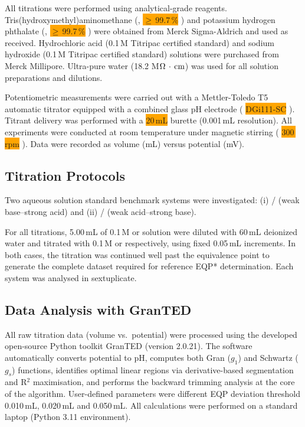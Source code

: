 \documentclass[twoside,twocolumn,9pt]{article}
\begin{document}
All titrations were performed using analytical-grade reagents.
Tris(hydroxymethyl)aminomethane (,
%
\colorbox{orange}{$\geq$\,99.7\,\%}
%
) and potassium hydrogen phthalate (,
%
\colorbox{orange}{$\geq$\,99.7\,\%}
%
) were obtained from Merck Sigma-Aldrich and used as received.
Hydrochloric acid (0.1\,M Titripac certified standard) and sodium hydroxide (0.1\,M Titripac certified standard) solutions were purchased from Merck Millipore.
Ultra-pure water (18.2 M$\Omega\,\cdot\,{\rm cm}$) was used for all solution preparations and dilutions.

Potentiometric measurements were carried out with a Mettler-Toledo T5 automatic titrator equipped with a combined glass pH electrode (
%
\colorbox{orange}{DGi111-SC}
%
).
Titrant delivery was performed with a
%
\colorbox{orange}{20\,mL}
%
burette (0.001\,mL resolution).
All experiments were conducted at room temperature under magnetic stirring (
%
\colorbox{orange}{300\,rpm}
%
).
Data were recorded as volume (mL) versus potential (mV).

\subsection*{Titration Protocols}

Two aqueous solution standard benchmark systems were investigated: (i) / (weak base–strong acid) and (ii) / (weak acid–strong base).

For all titrations, 5.00\,mL of 0.1\,M  or  solution were diluted with 60\,mL deionized water and titrated with 0.1\,M  or  respectively, using fixed 0.05\,mL increments.
In both cases, the titration was continued well past the equivalence point %
to generate the complete dataset required for reference EQP* determination. Each system was analysed in sextuplicate.

\subsection*{Data Analysis with GranTED}

All raw titration data (volume vs.\ potential) were processed using the developed open-source Python toolkit \textsf{GranTED} (version 2.0.21). The software automatically converts potential to pH, computes both Gran (\(g_1\)) and Schwartz (\(g_s\)) functions, identifies optimal linear regions via derivative-based segmentation and R$^2$ maximisation, and performs the backward trimming analysis at the core of the algorithm. User-defined parameters were different EQP deviation threshold 0.010\,mL, 0.020\,mL and 0.050\,mL. All calculations were performed on a standard laptop (Python 3.11 environment).
\end{document}
